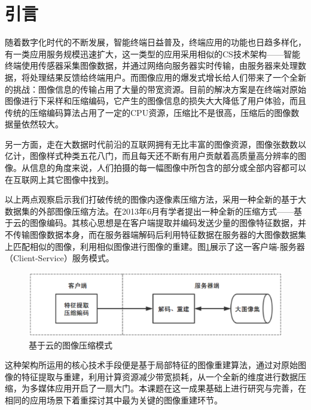 \documentclass[UTF8]{csoarticle}
\begin{document}

\maketitle



\section{引言}

随着数字化时代的不断发展，智能终端日益普及，终端应用的功能也日趋多样化，有一类应用服务规模迅速扩大，这一类型的应用采用相似的CS技术架构——智能终端使用传感器采集图像数据，并通过网络向服务器实时传输，由服务器来处理数据，将处理结果反馈给终端用户。而图像应用的爆发式增长给人们带来了一个全新的挑战：图像信息的传输占用了大量的带宽资源。目前的解决方案是在终端对原始图像进行下采样和压缩编码，它产生的图像信息的损失大大降低了用户体验，而且传统的压缩编码算法占用了一定的CPU资源，压缩比不是很高，压缩后的图像数据量依然较大。

另一方面，走在大数据时代前沿的互联网拥有无比丰富的图像资源，图像张数数以亿计，图像样式种类五花八门，而且每天还不断有用户贡献着高质量高分辨率的图像。从信息的角度来说，人们拍摄的每一幅图像中所包含的部分或全部内容都可以在互联网上其它图像中找到。

以上两点观察启示我们打破传统的图像内逐像素压缩方法，采用一种全新的基于大数据集的外部图像压缩方法。在2013年6月有学者提出一种全新的压缩方式——基于云的图像编码。其核心思想是在客户端提取并编码发送少量的图像特征数据，并不传输图像数据本身，而在服务器端解码后利用特征数据在服务器的大图像数据集上匹配相似的图像，利用相似图像进行图像的重建。图\ref{fig:overview}展示了这一客户端-服务器（Client-Service）服务模式。
\begin{figure}
\centering\includegraphics[width=12cm]{overview}
\caption{基于云的图像压缩模式}
\label{fig:overview}
\end{figure}
这种架构所运用的核心技术手段便是基于局部特征的图像重建算法，通过对原始图像的特征提取与重建，利用计算资源减少带宽损耗，从一个全新的维度进行数据压缩，为多媒体应用开启了一扇大门。本课题在这一成果基础上进行研究与完善，在相同的应用场景下着重探讨其中最为关键的图像重建环节。
\end{document}
